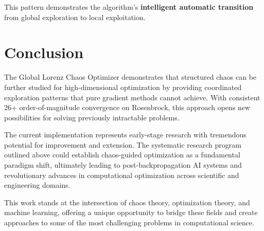 \documentclass[11pt,a4paper]{article}
\begin{document}
This pattern demonstrates the algorithm's \textbf{intelligent automatic transition} from global exploration to local exploitation.


\section{Conclusion}

The Global Lorenz Chaos Optimizer demonstrates that structured chaos can be further studied for high-dimensional optimization by providing coordinated exploration patterns that pure gradient methods cannot achieve. With consistent 26+ order-of-magnitude convergence on Rosenbrock, this approach opens new possibilities for solving previously intractable problems.

The current implementation represents early-stage research with tremendous potential for improvement and extension. The systematic research program outlined above could establish chaos-guided optimization as a fundamental paradigm shift, ultimately leading to post-backpropagation AI systems and revolutionary advances in computational optimization across scientific and engineering domains.

This work stands at the intersection of chaos theory, optimization theory, and machine learning, offering a unique opportunity to bridge these fields and create approaches to some of the most challenging problems in computational science.
\end{document}
